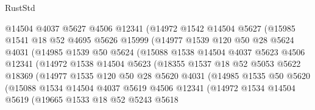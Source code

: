 \begin{lexlean}{RustStd}
\begin{coremodule}
                  @14504
                  @4037
                  @5627
                  @4506
                  @12341
                  (@14972
                    @1542
                    @14504
                    @5627
                    (@15985
                      @1541
                      @18
                      @52
                      @4695
                      @5626
                      @15999
                      (@14977
                        @1539
                        @120
                        @50
                        @28
                        @5624
                        @4031
                        (@14985
                          @1539
                          @50
                          @5624
                          (@15088
                            @1538
                            @14504
                            @4037
                            @5623
                            @4506
                            @12341
                            (@14972
                              @1538
                              @14504
                              @5623
                              (@18355
                                @1537
                                @18
                                @52
                                @5053
                                @5622
                                @18369
                                (@14977
                                  @1535
                                  @120
                                  @50
                                  @28
                                  @5620
                                  @4031
                                  (@14985
                                    @1535
                                    @50
                                    @5620
                                    (@15088
                                      @1534
                                      @14504
                                      @4037
                                      @5619
                                      @4506
                                      @12341
                                      (@14972
                                        @1534
                                        @14504
                                        @5619
                                        (@19665
                                          @1533
                                          @18
                                          @52
                                          @5243
                                          @5618

\end{coremodule}
\end{lexlean}
